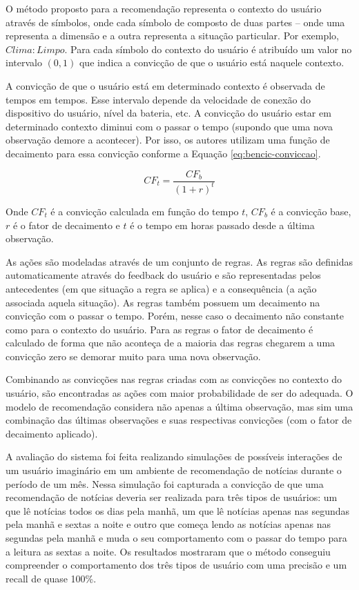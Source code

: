 O método proposto para a recomendação representa o contexto do usuário através de símbolos, onde cada símbolo de
composto de duas partes – onde uma representa a dimensão e a outra representa a situação particular. Por exemplo,
$Clima:Limpo$. Para cada símbolo do contexto do usuário é atribuído um valor no intervalo $(0, 1)$ que indica a convicção
de que o usuário está naquele contexto.

A convicção de que o usuário está em determinado contexto é observada de tempos em tempos. Esse intervalo depende da
velocidade de conexão do dispositivo do usuário, nível da bateria, etc. A convicção do usuário estar em determinado
contexto diminui com o passar o tempo (supondo que uma nova observação demore a acontecer). Por isso, os autores
utilizam uma função de decaimento para essa convicção conforme a Equação \ref{eq:bencic-conviccao}.

\begin{equation}
  \label{eq:bencic-conviccao}
  CF_t = \frac{CF_b}{(1+r)^t}
\end{equation}

Onde $CF_t$ é a convicção calculada em função do tempo $t$, $CF_b$ é a convicção base, $r$ é o fator de decaimento e $t$
é o tempo em horas passado desde a última observação.

As ações são modeladas através de um conjunto de regras. As regras são definidas automaticamente através do feedback do
usuário e são representadas pelos antecedentes (em que situação a regra se aplica) e a consequência (a ação associada
aquela situação). As regras também possuem um decaimento na convicção com o passar o tempo. Porém, nesse caso o
decaimento não constante como para o contexto do usuário. Para as regras o fator de decaimento é calculado de forma
que não aconteça de a maioria das regras chegarem a uma convicção zero se demorar muito para uma nova observação.

Combinando as convicções nas regras criadas com as convicções no contexto do usuário, são encontradas as ações com
maior probabilidade de ser do adequada. O modelo de recomendação considera não apenas a última observação, mas sim uma
combinação das últimas observações e suas respectivas convicções (com o fator de decaimento aplicado).

A avaliação do sistema foi feita realizando simulações de possíveis interações de um usuário imaginário em um ambiente
de recomendação de notícias durante o período de um mês. Nessa simulação foi capturada a convicção de que uma
recomendação de notícias deveria ser realizada para três tipos de usuários: um que lê notícias todos os dias pela
manhã, um que lê notícias apenas nas segundas pela manhã e sextas a noite e outro que começa lendo as notícias apenas
nas segundas pela manhã e muda o seu comportamento com o passar do tempo para a leitura as sextas a noite. Os resultados
mostraram que o método conseguiu compreender o comportamento dos três tipos de usuário com uma precisão e um recall de
quase 100\%.

